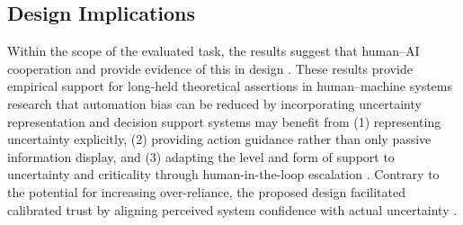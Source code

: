 \documentclass[journal]{IEEEtran}
\theoremstyle{plain}
\theoremstyle{definition}
\providecommand{\DIFaddtex}[1]{{\protect\color{blue} \sf #1}} %
\providecommand{\DIFdeltex}[1]{{\protect\color{red} \scriptsize #1}} %
\providecommand{\DIFaddbegin}{} %
\providecommand{\DIFaddend}{} %
\providecommand{\DIFdelbegin}{} %
\providecommand{\DIFdelend}{} %
\providecommand{\DIFadd}[1]{\texorpdfstring{\DIFaddtex{#1}}{#1}} %
\providecommand{\DIFdel}[1]{\texorpdfstring{\DIFdeltex{#1}}{}} %
\newcommand{\DIFscaledelfig}{0.5}
\newlength{\DIFdelgraphicswidth} %
\newlength{\DIFdelgraphicsheight} %
\newcommand{\DIFaddincludegraphics}[2][]{{\color{blue}\fbox{\DIFOincludegraphics[#1]{#2}}}} %
\newcommand{\DIFdelincludegraphics}[2][]{%
\sbox{\DIFdelgraphicsbox}{\DIFOincludegraphics[#1]{#2}}%
\settoboxwidth{\DIFdelgraphicswidth}{\DIFdelgraphicsbox} %
\settoboxtotalheight{\DIFdelgraphicsheight}{\DIFdelgraphicsbox} %
\scalebox{\DIFscaledelfig}{%
\parbox[b]{\DIFdelgraphicswidth}{\usebox{\DIFdelgraphicsbox}\\[-\baselineskip] \rule{\DIFdelgraphicswidth}{0em}}\llap{\resizebox{\DIFdelgraphicswidth}{\DIFdelgraphicsheight}{%
\setlength{\unitlength}{\DIFdelgraphicswidth}%
\begin{picture}(1,1)%
\thicklines\linethickness{2pt} %
{\color[rgb]{1,0,0}\put(0,0){\framebox(1,1){}}}%
{\color[rgb]{1,0,0}\put(0,0){\line( 1,1){1}}}%
{\color[rgb]{1,0,0}\put(0,1){\line(1,-1){1}}}%
\end{picture}%
}\hspace*{3pt}}} %
} %
\DeclareRobustCommand{\DIFaddbegin}{\DIFOaddbegin \let\includegraphics\DIFaddincludegraphics} %
\DeclareRobustCommand{\DIFaddend}{\DIFOaddend \let\includegraphics\DIFOincludegraphics} %
\DeclareRobustCommand{\DIFdelbegin}{\DIFOdelbegin \let\includegraphics\DIFdelincludegraphics} %
\DeclareRobustCommand{\DIFdelend}{\DIFOaddend \let\includegraphics\DIFOincludegraphics} %
\begin{document}
\subsection{\DIFadd{Design Implications}}
\DIFadd{Within the scope of the evaluated task, the results suggest that }\DIFaddend human--AI \DIFdelbegin \DIFdel{cooperation and provide evidence of this in design \cite{Hodgson2013THMS,Bach2024Access}.
These results provide empirical support for long-held theoretical assertions in human--machine systems research that automation bias can be reduced by incorporating uncertainty representation and }\DIFdelend \DIFaddbegin \DIFadd{decision support systems may benefit from (1) representing uncertainty explicitly, (2) providing action guidance rather than only passive information display, and (3) adapting the level and form of support to uncertainty and criticality through }\DIFaddend human-in-the-loop escalation\DIFdelbegin \DIFdel{. Contrary to the potential for increasing over-reliance, the proposed design facilitated calibrated trust by aligning perceived system confidence with actual uncertainty \cite{Miller2019XRDS,Weidinger2022FAccT,Lai2023FAccT}.
}%


\end{document}
